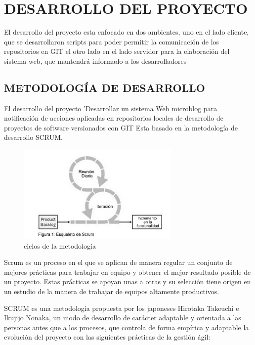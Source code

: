 

%
\chapter{DESARROLLO DEL PROYECTO}
El desarrollo del proyecto esta enfocado en dos ambientes, uno en el lado cliente, que se desarrollaron scripts para poder permitir la comunicación de los repositorios en GIT
el otro lado en el lado servidor para la elaboración del sistema web, que mantendrá informado a los desarrolladores
\section{METODOLOGÍA DE DESARROLLO}
El desarrollo del proyecto 'Desarrollar un sistema Web microblog para notificación de acciones aplicadas en repositorios locales de desarrollo de proyectos de software versionados con GIT Esta basado en la metodología de desarrollo SCRUM.

\begin{figure}[htb]
\centering
\includegraphics[width=0.7\textwidth]{imagenes/image-0.png}%
\caption{ciclos de la metodología}
\label{contexto:figura}
\end{figure}

Scrum es un proceso en el que se aplican de manera regular un conjunto de mejores prácticas para trabajar en equipo y obtener el mejor resultado posible de un proyecto. Estas prácticas se apoyan unas a otras y su selección tiene origen en un estudio de la manera de trabajar de equipos altamente productivos.

SCRUM es una metodología propuesta por los japoneses Hirotaka Takeuchi e Ikujijo Nonaka, un modo de desarrollo de carácter adaptable y orientada a las personas antes
que a los procesos, que controla de forma empírica y adaptable la evolución del proyecto con las siguientes prácticas de la gestión ágil:


